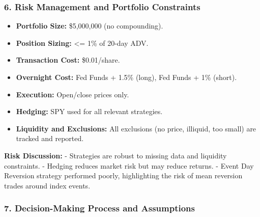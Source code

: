 \documentclass[11pt]{article}
\providecommand{\tightlist}{%
      \setlength{\itemsep}{0pt}\setlength{\parskip}{0pt}}
\begin{document}
    \subsubsection*{6. Risk Management and Portfolio Constraints}

\begin{itemize}
\tightlist
\item
  \textbf{Portfolio Size:} \$5,000,000 (no compounding).
\item
  \textbf{Position Sizing:} \textless= 1\% of 20-day ADV.
\item
  \textbf{Transaction Cost:} \$0.01/share.
\item
  \textbf{Overnight Cost:} Fed Funds + 1.5\% (long), Fed Funds + 1\%
  (short).
\item
  \textbf{Execution:} Open/close prices only.
\item
  \textbf{Hedging:} SPY used for all relevant strategies.
\item
  \textbf{Liquidity and Exclusions:} All exclusions (no price, illiquid,
  too small) are tracked and reported.
\end{itemize}

\textbf{Risk Discussion:} - Strategies are robust to missing data and
liquidity constraints. - Hedging reduces market risk but may reduce
returns. - Event Day Reversion strategy performed poorly, highlighting
the risk of mean reversion trades around index events.

\subsubsection*{7. Decision-Making Process and Assumptions}
\end{document}
